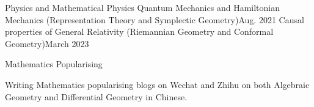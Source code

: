 \HeadingItemListStart
	\HeadingItemPlain
		{Physics and Mathematical Physics}{}
	\SubHeadingItem
		{Quantum Mechanics and Hamiltonian Mechanics (Representation Theory and Symplectic Geometry)}{Aug. 2021}
	\SubHeadingItem
		{Causal properties of General Relativity (Riemannian Geometry and Conformal Geometry)}{March 2023}

	\HeadingItemPlain
		{Mathematics Popularising}{}
		\ItemListStart
			\item Writing Mathematics popularising blogs on Wechat and Zhihu on both Algebraic Geometry and Differential Geometry in Chinese.
		\ItemListEnd
	
\HeadingItemListEnd

